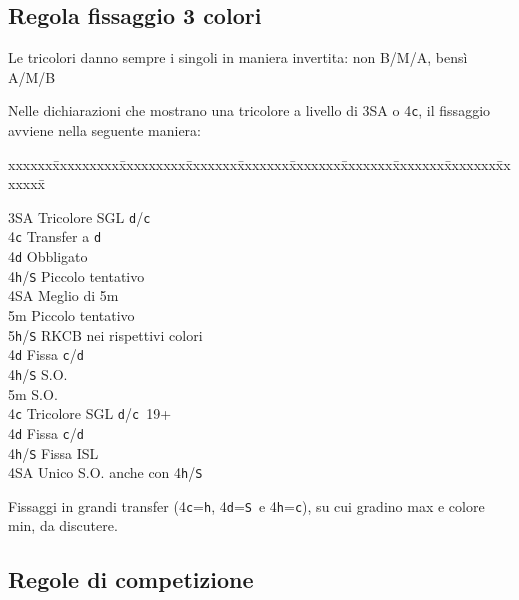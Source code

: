 \documentclass[a4paper,italian]{article}
\newcommand{\BS}{\small{\texttt{S}}}
\newcommand{\BC}{\small{\texttt{c}}}
\newcommand{\BD}{\small{\texttt{d}}}
\newcommand{\BH}{\small{\texttt{h}}}
\newenvironment{bidtable}
{\begin{tabbing}

    xxxxxx\=xxxxxxxxx\=xxxxxxxxx\=xxxxxxx\=xxxxxxx\=xxxxxxx\=xxxxxxx\=xxxxxxx\=xxxxxxx\=xxxxxxx\=\kill}
{\end{tabbing} }%
\newenvironment{attenzione}[1]
{\begin{tcolorbox}[colframe=red!80!white,title=#1]}
    {
\end{tcolorbox} }%
\newenvironment{varie}[1]
{\begin{tcolorbox}[colframe=green!40!black,title=#1]}
    {
\end{tcolorbox} }%
\begin{document}
\subsection{Regola fissaggio 3 colori}\label{fissaggi}

\begin{attenzione}{Regola generale per le tricolori}
    Le tricolori danno sempre i singoli in maniera invertita: non B/M/A, bensì A/M/B
\end{attenzione}

Nelle dichiarazioni che mostrano una tricolore a livello di 3\small{SA} o 4\BC , il fissaggio avviene nella seguente maniera:
\bigbreak
\begin{bidtable}

    3\small{SA} \> Tricolore SGL \BD/\BC\+\\
    4\BC \> Transfer a \BD \+\\
    4\BD \> Obbligato\+\\
    4\BH/\BS \> Piccolo tentativo\\
    4\small{SA} \> Meglio di 5m\\
    5m \> Piccolo tentativo\\
    5\BH/\BS \> RKCB nei rispettivi colori\-\-\\
    4\BD \> Fissa \BC/\BD\\
    4\BH/\BS \> S.O.\\
    5m \> S.O.\-\\
    4\BC \> Tricolore SGL \BD/\BC\ 19+\+\\
    4\BD \> Fissa \BC/\BD\\
    4\BH/\BS \> Fissa ISL\\
    4\small{SA} \> Unico S.O. anche con 4\BH/\BS\-
\end{bidtable}
\bigbreak
\begin{varie}{Alternativa ai fissaggi}
    Fissaggi in grandi transfer (4\BC =\BH , 4\BD =\BS\ e 4\BH =\BC ), su cui gradino max e colore min, da discutere.
\end{varie}
\setcounter{secnumdepth}{4}

\subsection{Regole di competizione}
\end{document}
